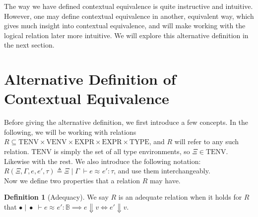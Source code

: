 \documentclass[twoside,11pt,openright]{report}
\theoremstyle{definition}
\newtheorem{definition}{Definition}[section]
\newcommand{\expr}{e}
\newcommand{\val}{v}
\newcommand{\Tbool}{\mathbb{B}}
\newcommand{\typ}{\tau}
\newcommand{\venv}{\Gamma}
\newcommand{\tenv}{\Xi}
\newcommand{\emptenv}{\bullet}
\newcommand{\empvenv}{\bullet}
\newcommand{\VENV}{\mathrm{VENV}}
\newcommand{\TENV}{\mathrm{TENV}}
\newcommand{\EXPR}{\mathrm{EXPR}}
\newcommand{\TYPE}{\mathrm{TYPE}}
\newcommand{\jdgRel}[6]{#1 \; | \; #2 \; \vdash #3 \approx^{#4} #5 : #6}
\begin{document}
The way we have defined contextual equivalence is quite instructive and intuitive. However, one may define contextual equivalence in another, equivalent way, which gives much insight into contextual equivalence, and will make working with the logical relation later more intuitive. We will explore this alternative definition in the next section.

\section{Alternative Definition of Contextual Equivalence}
Before giving the alternative definition, we first introduce a few concepts. In the following, we will be working with relations $R \subseteq \TENV \times \VENV \times \EXPR \times \EXPR \times \TYPE$, and $R$ will refer to any such relation. $\TENV$ is simply the set of all type environments, so $\tenv \in \TENV$. Likewise with the rest. We also introduce the following notation: $R(\tenv, \venv, \expr, \expr', \typ) \triangleq \jdgRel{\tenv}{\venv}{\expr}{}{\expr'}{\typ}$, and use them interchangeably.\\
Now we define two properties that a relation $R$ may have.
\begin{definition}[Adequacy]
  We say $R$ is an adequate relation when it holds for $R$ that $\jdgRel{\emptenv}{\empvenv}{\expr}{}{\expr'}{\Tbool} \implies \expr \Downarrow \val \iff \expr' \Downarrow \val$.
\end{definition}
\end{document}
